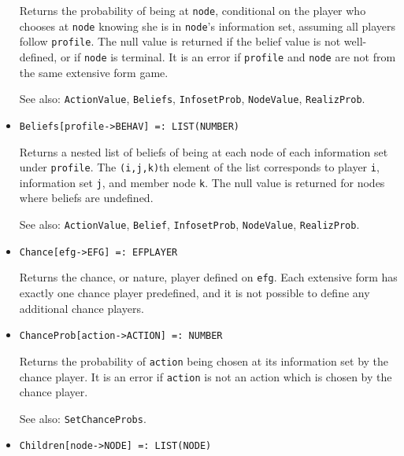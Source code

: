 \begin{itemize}
\bd
Returns the probability of being at \verb+node+, conditional on the
player who chooses at \verb+node+ knowing she is in \verb+node+'s
information set, assuming all players follow \verb+profile+.  The null
value is returned if the belief value is not well-defined, or if
\verb+node+ is terminal.  It is an error if \verb+profile+ and \verb+node+
are not from the same extensive form game.
\item [See also:] \verb+ActionValue+, \verb+Beliefs+, \verb+InfosetProb+,
\verb+NodeValue+, \verb+RealizProb+.
\ed

\item{}
\protect \large \begin{verbatim}
Beliefs[profile->BEHAV] =: LIST(NUMBER) 
\end{verbatim}\normalsize

\bd 
Returns a nested list of
beliefs of being at each node of each information set under
\verb+profile+. The \verb+(i,j,k)+th element of the list corresponds
to player \verb+i+, information set \verb+j+, and member node
\verb+k+. The null value is returned for nodes where beliefs are
undefined.

\item [See also:] \verb+ActionValue+, \verb+Belief+, \verb+InfosetProb+,
\verb+NodeValue+, \verb+RealizProb+.
\ed





\item{}
\protect \large \begin{verbatim}
Chance[efg->EFG] =: EFPLAYER 
\end{verbatim}\normalsize

\bd
Returns the chance, or nature, player defined on \verb+efg+.
Each extensive form has exactly one
chance player predefined, and it is not possible to define any additional
chance players.
\ed

\item{}
\protect \large \begin{verbatim}
ChanceProb[action->ACTION] =: NUMBER 
\end{verbatim}\normalsize

\bd
Returns the probability of \verb+action+ being chosen at its information
set by the chance player.  It is an error if \verb+action+ is not an action
which is chosen by the chance player.
\item [See also:] \verb+SetChanceProbs+.
\ed

\item{}
\protect \large \begin{verbatim} 
Children[node->NODE] =: LIST(NODE) 
\end{verbatim}\normalsize


\end{itemize}
